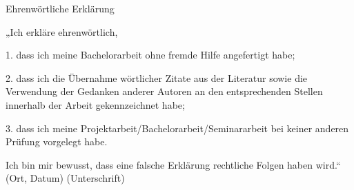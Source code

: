 \documentclass[../Document.tex]{subfiles}
\begin{document}
\thispagestyle{empty}
Ehrenwörtliche Erklärung

„Ich erkläre ehrenwörtlich,

1. dass ich meine Bachelorarbeit ohne fremde Hilfe angefertigt habe;

2. dass ich die Übernahme wörtlicher Zitate aus der Literatur sowie die Verwendung der Gedanken anderer Autoren an den entsprechenden Stellen innerhalb der Arbeit gekennzeichnet habe;

3. dass ich meine Projektarbeit/Bachelorarbeit/Seminararbeit bei keiner anderen Prüfung vorgelegt habe.

Ich bin mir bewusst, dass eine falsche Erklärung rechtliche Folgen haben wird.“\\[4.5cm]
(Ort, Datum) (Unterschrift)
\end{document}
